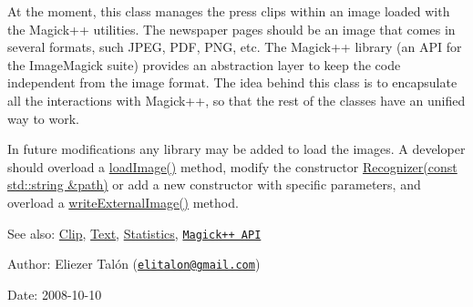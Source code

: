 At the moment, this class manages the press clips within an image loaded with the Magick++ utilities. The newspaper pages should be an image that comes in several formats, such JPEG, PDF, PNG, etc. The Magick++ library (an API for the ImageMagick suite) provides an abstraction layer to keep the code independent from the image format. The idea behind this class is to encapsulate all the interactions with Magick++, so that the rest of the classes have an unified way to work.

In future modifications any library may be added to load the images. A developer should overload a \hyperlink{class_recognizer_acc4244738f2577a0c344c3b3af22eb0}{loadImage()} method, modify the constructor \hyperlink{class_recognizer_50ffc181208bb07ae651aba6249ee7e4}{Recognizer(const std::string \&path)} or add a new constructor with specific parameters, and overload a \hyperlink{class_recognizer_559f62a3e3e2d0b799bab38e975b4b67}{writeExternalImage()} method.

\begin{Desc}
\item[See also:]\hyperlink{class_clip}{Clip}, \hyperlink{class_text}{Text}, \hyperlink{class_statistics}{Statistics}, \href{http://www.imagemagick.org/Magick++/}{\tt Magick++ API}\end{Desc}
\begin{Desc}
\item[Author:]Eliezer Talón (\href{mailto:elitalon@gmail.com}{\tt elitalon@gmail.com}) \end{Desc}
\begin{Desc}
\item[Date:]2008-10-10 \end{Desc}
